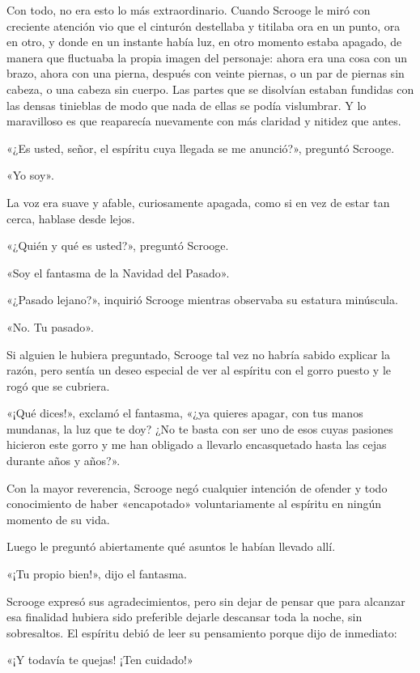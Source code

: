 \documentclass{novela}
\begin{document}
 Con todo, no era esto lo más extraordinario. Cuando Scrooge le miró con creciente atención vio que el cinturón destellaba y titilaba ora en un punto, ora en otro, y donde en un instante había luz, en otro momento estaba apagado, de manera que fluctuaba la propia imagen del personaje: ahora era una cosa con un brazo, ahora con una pierna, después con veinte piernas, o un par de piernas sin cabeza, o una cabeza sin cuerpo. Las partes que se disolvían estaban fundidas con las densas tinieblas de modo que nada de ellas se podía vislumbrar. Y lo maravilloso es que reaparecía nuevamente con más claridad y nitidez que antes.

 «¿Es usted, señor, el espíritu cuya llegada se me anunció?», preguntó Scrooge.

 «Yo soy».

 La voz era suave y afable, curiosamente apagada, como si en vez de estar tan cerca, hablase desde lejos.

 «¿Quién y qué es usted?», preguntó Scrooge.

 «Soy el fantasma de la Navidad del Pasado».

 «¿Pasado lejano?», inquirió Scrooge mientras observaba su estatura minúscula.

 «No. Tu pasado».

 Si alguien le hubiera preguntado, Scrooge tal vez no habría sabido explicar la razón, pero sentía un deseo especial de ver al espíritu con el gorro puesto y le rogó que se cubriera.

 «¡Qué dices!», exclamó el fantasma, «¿ya quieres apagar, con tus manos mundanas, la luz que te doy? ¿No te basta con ser uno de esos cuyas pasiones hicieron este gorro y me han obligado a llevarlo encasquetado hasta las cejas durante años y años?».

 Con la mayor reverencia, Scrooge negó cualquier intención de ofender y todo conocimiento de haber «encapotado» voluntariamente al espíritu en ningún momento de su vida.

 Luego le preguntó abiertamente qué asuntos le habían llevado allí.

 «¡Tu propio bien!», dijo el fantasma.

 Scrooge expresó sus agradecimientos, pero sin dejar de pensar que para alcanzar esa finalidad hubiera sido preferible dejarle descansar toda la noche, sin sobresaltos. El espíritu debió de leer su pensamiento porque dijo de inmediato:

 «¡Y todavía te quejas! ¡Ten cuidado!»
\end{document}
